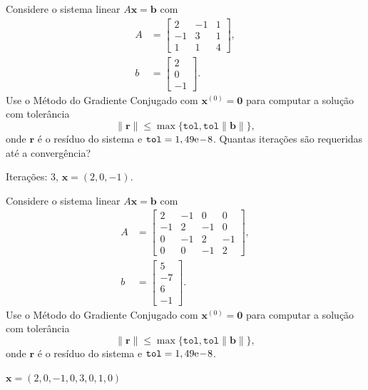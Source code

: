 \begin{exer}
  Considere o sistema linear $A\pmb{x} = \pmb{b}$ com
  \begin{align}
    A &=
    \begin{bmatrix}
      2 & -1 & 1\\
      -1 & 3 & 1\\
      1 & 1 & 4
    \end{bmatrix},\\
    b &=
    \begin{bmatrix}
      2\\
      0\\
      -1
    \end{bmatrix}.
  \end{align}
  Use o Método do Gradiente Conjugado com $\pmb{x}^{(0)} = \pmb{0}$ para computar a solução com tolerância
  \begin{equation}
    \|\pmb{r}\| \leq \max\{\texttt{tol}, \texttt{tol}\|\pmb{b}\|\},
  \end{equation}
  onde $\pmb{r}$ é o resíduo do sistema e $\texttt{tol} = 1,49\mathrm{e}\!-\!8$. Quantas iterações são requeridas até a convergência?
\end{exer}
\begin{resp}
  Iterações: 3, $\pmb{x} = (2, 0, -1)$.
\end{resp}

\begin{exer}
  Considere o sistema linear $A\pmb{x} = \pmb{b}$ com
  \begin{align}
    A &=
    \begin{bmatrix}
      2 & -1 & 0 & 0\\
      -1 & 2 & -1 & 0\\
      0 & -1 & 2 & -1 \\
      0 & 0 & -1 & 2
    \end{bmatrix},\\
    b &=
    \begin{bmatrix}
      5\\
      -7\\
      6\\
      -1
    \end{bmatrix}.
  \end{align}
  Use o Método do Gradiente Conjugado com $\pmb{x}^{(0)} = \pmb{0}$ para computar a solução com tolerância
  \begin{equation}
    \|\pmb{r}\| \leq \max\{\texttt{tol}, \texttt{tol}\|\pmb{b}\|\},
  \end{equation}
  onde $\pmb{r}$ é o resíduo do sistema e $\texttt{tol} = 1,49\mathrm{e}\!-\!8$.
\end{exer}
\begin{resp}
  $\pmb{x} = \left(2,0, -1,0, 3,0, 1,0\right)$
\end{resp}


